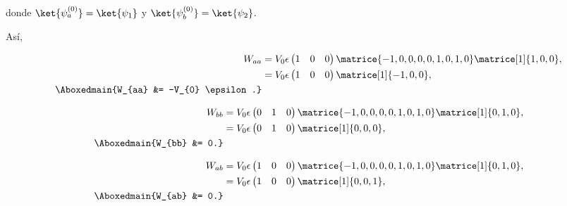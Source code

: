 \documentclass[./../main.tex]{subfiles}
\begin{document}
\begin{exercise}
\begin{enumerate}[label=(\alph*)]
\begin{solution}
            donde \(\ket{\psi_{a}^{(0)}} = \ket{\psi_{1}}\) y \(\ket{\psi_{b}^{(0)}} = \ket{\psi_{2}}\).

            \pagebreak
            Así,

            \begin{align}
                W_{aa} &= V_{0} \epsilon \begin{pmatrix}
                    1 & 0 & 0
                \end{pmatrix} \matrice{-1, 0, 0, 0, 0, 1, 0, 1, 0}\matrice[1]{1, 0, 0},\nonumber\\
                &= V_{0} \epsilon \begin{pmatrix}
                    1 & 0 & 0
                \end{pmatrix}\matrice[1]{-1, 0, 0},\nonumber\\
                \Aboxedmain{W_{aa} &= -V_{0} \epsilon.}\label{eq:element-Waa}
            \end{align}

            \begin{align}
                W_{bb} &= V_{0} \epsilon \begin{pmatrix}
                    0 & 1 & 0
                \end{pmatrix} \matrice{-1, 0, 0, 0, 0, 1, 0, 1, 0}\matrice[1]{0, 1, 0},\nonumber\\
                &= V_{0} \epsilon \begin{pmatrix}
                    0 & 1 & 0
                \end{pmatrix}\matrice[1]{0, 0, 0},\nonumber\\
                \Aboxedmain{W_{bb} &= 0.}\label{eq:element-Wbb}
            \end{align}

            \begin{align}
                W_{ab} &= V_{0} \epsilon \begin{pmatrix}
                    1 & 0 & 0
                \end{pmatrix} \matrice{-1, 0, 0, 0, 0, 1, 0, 1, 0}\matrice[1]{0, 1, 0},\nonumber\\
                &= V_{0} \epsilon \begin{pmatrix}
                    1 & 0 & 0
                \end{pmatrix}\matrice[1]{0, 0, 1},\nonumber\\
                \Aboxedmain{W_{ab} &= 0.}\label{eq:element-Wab}
            \end{align}


\end{solution}
\end{enumerate}
\end{exercise}
\end{document}
